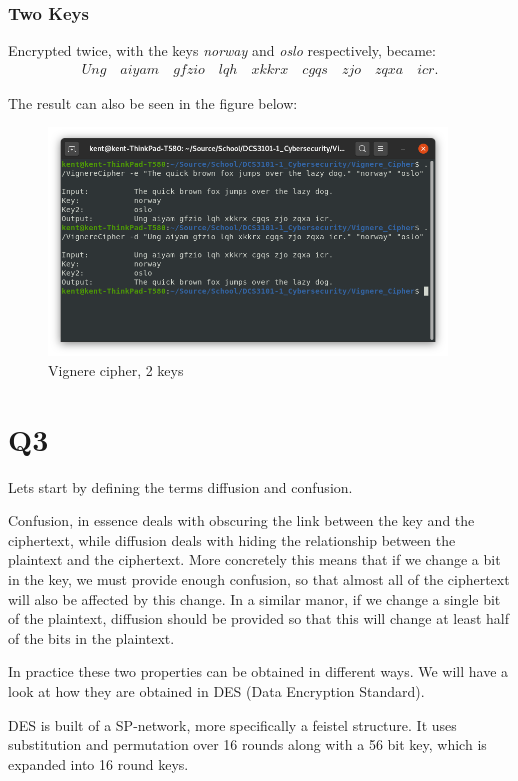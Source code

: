 \documentclass{article}
\begin{document}
\subsubsection{Two Keys}


Encrypted twice, with the keys \textit{norway} and \textit{oslo} respectively, became:
\begin{align*}
Ung\quad aiyam\quad gfzio\quad lqh\quad xkkrx\quad cgqs\quad zjo\quad zqxa\quad icr.
\end{align*}

The result can also be seen in the figure below:
\begin{figure}[H]
 \centering
  \includegraphics[width=300pt]{img/vignere2keys.png}
 \caption{Vignere cipher, 2 keys}
 \end{figure}

\section{Q3}
Lets start by defining the terms diffusion and confusion.

Confusion, in essence deals with obscuring the link between the key and the ciphertext, while diffusion deals with hiding the relationship between the plaintext and the ciphertext. More concretely this means that if we change a bit in the key, we must provide enough confusion, so that almost all of the ciphertext will also be affected by this change. In a similar manor, if we change a single bit of the plaintext, diffusion should be provided so that this will change at least half of the bits in the plaintext. 

In practice these two properties can be obtained in different ways. We will have a look at how they are obtained in DES (Data Encryption Standard). 

DES is built of a SP-network, more specifically a feistel structure. It uses substitution and permutation over 16 rounds along with a 56 bit key, which is expanded into 16 round keys. 
\end{document}
